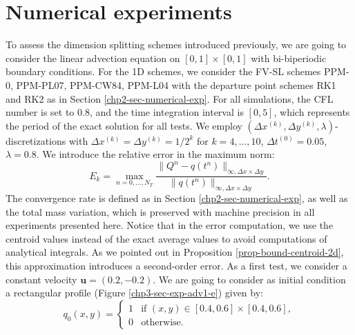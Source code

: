 \section{Numerical experiments}
\label{sec-ds-exp}
To assess the dimension splitting schemes introduced previously, 
we are going to consider the linear advection equation on $[0,1]\times[0,1]$ 
with bi-biperiodic boundary conditions.
For the 1D schemes, we consider the FV-SL schemes PPM-0, PPM-PL07, PPM-CW84, PPM-L04
with the departure point schemes RK1 and RK2 as in Section \ref{chp2-sec-numerical-exp}.
For all simulations, the CFL number is set to $0.8$, and the time integration interval 
is $[0,5]$, which represents the period of the exact solution for all tests.
We employ $(\Delta x^{(k)},\Delta y^{(k)},\lambda)$-discretizations with $\Delta x^{(k)} = \Delta y^{(k)} = 1/2^k$ for $k=4, \ldots, 10$,
$\Delta t^{(0)} = 0.05$, $\lambda = 0.8$.
We introduce the relative error in the maximum norm:
\begin{equation*}
	E_k = \max_{n=0,\ldots, N_T}
	\frac{\| Q^n - q(t^n) \|_{\infty, \Delta x \times \Delta y}}
	{\|q(t^n)\|_{\infty, \Delta x \times \Delta y}}.
\end{equation*}
The convergence rate is defined as in Section \ref{chp2-sec-numerical-exp}, 
as well as the total mass variation, which is preserved with machine precision
in all experiments presented here.
Notice that in the error computation, we use the centroid values instead
of the exact average values to avoid computations of analytical integrals.
As we pointed out in Proposition \ref{prop-bound-centroid-2d}, this approximation introduces a second-order error.
As a first test, we consider a constant velocity $\boldsymbol{u}=(0.2,-0.2)$.
We are going to consider as initial condition a rectangular profile
(Figure \ref{chp3-sec-exp-adv1-e}) given by:
\begin{equation}
	\label{chp3-ic1}
	q_0(x,y) =  
	\begin{cases}
		1 & \text{if } (x,y) \in [0.4,0.6]\times [0.4,0.6],\\
		0 & \text{otherwise}.
	\end{cases}
\end{equation}

